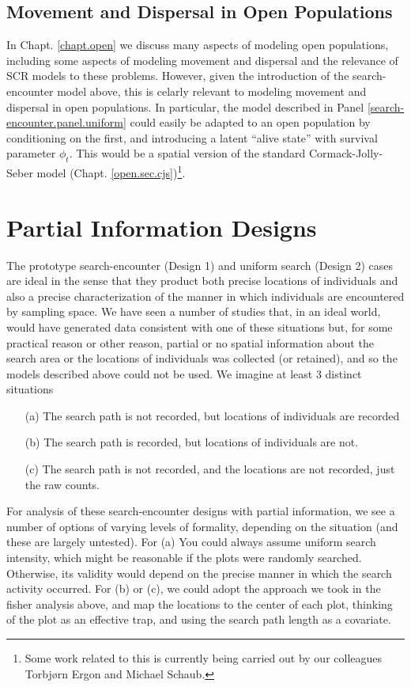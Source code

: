 \subsection{Movement and Dispersal in Open Populations}

In Chapt. \ref{chapt.open} we discuss many aspects of modeling open
populations, including some aspects of modeling movement and dispersal
and the relevance of SCR models to these problems. However, given the
introduction of the search-encounter model above, this is celarly
relevant to modeling movement and dispersal in open populations.  In
particular, the model described in Panel
\ref{search-encounter.panel.uniform} could easily be adapted to an
open population by conditioning on the first, and introducing a latent
``alive state'' with survival parameter $\phi_{t}$. This would be a
spatial version of the standard Cormack-Jolly-Seber model
(Chapt. \ref{open.sec.cjs})\footnote{Some work related to this is
  currently being carried out by our colleagues Torbj{\o}rn Ergon and
  Michael Schaub.}.


\section{Partial Information Designs}

The prototype search-encounter (Design 1) and uniform search (Design
2) cases are ideal in the sense that they product both precise
locations of individuals and also a precise characterization of the
manner in which individuals are encountered by sampling space.  We
have seen a number of studies that, in an ideal world, would have
generated data consistent with one of these situations but, for some
practical reason or other reason, partial or no spatial information
about the search area or the locations of individuals was collected
(or retained), and so the models described above could not be used.
We imagine at least
3 distinct situations

\begin{itemize}
\item[(a)] The search path is not recorded, but locations  of
  individuals are recorded
\item[(b)] The search path is recorded, but locations of individuals
  are not.
\item[(c)] The search path is not recorded, and the locations are not
  recorded, just the raw counts.
\end{itemize}

For analysis of these search-encounter designs with partial information,
we see a number of options of varying levels of formality,
depending on the situation (and these are largely untested).
For (a) You could always assume uniform search intensity,
which might be reasonable if the plots were randomly
searched. Otherwise, its validity would depend on the precise manner
in which the search activity occurred.
For (b) or (c), we could adopt the approach we took in the fisher analysis
above, and  map the locations to the center of each plot, thinking of
the plot as an effective trap, and using the search path length
as a covariate.

